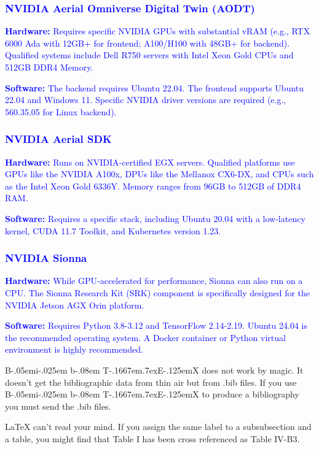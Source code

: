 \documentclass[conference]{IEEEtran}
\def\BibTeX{{\rm B\kern-.05em{\sc i\kern-.025em b}\kern-.08em
    T\kern-.1667em\lower.7ex\hbox{E}\kern-.125emX}}
\begin{document}
\textcolor{blue}{\subsubsection{NVIDIA Aerial Omniverse Digital Twin (AODT)}}

\textcolor{blue}{\textbf{Hardware:} Requires specific NVIDIA GPUs with substantial vRAM (e.g., RTX 6000 Ada with 12GB+ for frontend; A100/H100 with 48GB+ for backend). Qualified systems include Dell R750 servers with Intel Xeon Gold CPUs and 512GB DDR4 Memory.}

\textcolor{blue}{\textbf{Software:} The backend requires Ubuntu 22.04. The frontend supports Ubuntu 22.04 and Windows 11. Specific NVIDIA driver versions are required (e.g., 560.35.05 for Linux backend).}

\textcolor{blue}{\subsubsection{NVIDIA Aerial SDK}}

\textcolor{blue}{\textbf{Hardware:} Runs on NVIDIA-certified EGX servers. Qualified platforms use GPUs like the NVIDIA A100x, DPUs like the Mellanox CX6-DX, and CPUs such as the Intel Xeon Gold 6336Y. Memory ranges from 96GB to 512GB of DDR4 RAM.}

\textcolor{blue}{\textbf{Software:} Requires a specific stack, including Ubuntu 20.04 with a low-latency kernel, CUDA 11.7 Toolkit, and Kubernetes version 1.23.}

\textcolor{blue}{\subsubsection{NVIDIA Sionna}}

\textcolor{blue}{\textbf{Hardware:} While GPU-accelerated for performance, Sionna can also run on a CPU. The Sionna Research Kit (SRK) component is specifically designed for the NVIDIA Jetson AGX Orin platform.}

\textcolor{blue}{\textbf{Software:} Requires Python 3.8-3.12 and TensorFlow 2.14-2.19. Ubuntu 24.04 is the recommended operating system. A Docker container or Python virtual environment is highly recommended.}

{\BibTeX} does not work by magic. It doesn't get the bibliographic
data from thin air but from .bib files. If you use {\BibTeX} to produce a
bibliography you must send the .bib files. 

{\LaTeX} can't read your mind. If you assign the same label to a
subsubsection and a table, you might find that Table I has been cross
referenced as Table IV-B3. 
\end{document}
